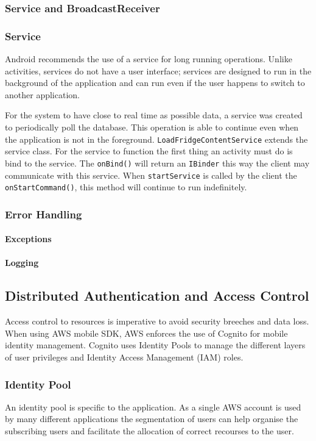 \documentclass[a4paper, 11pt]{article}
\begin{document}
\subsubsection{Service and BroadcastReceiver}
\subsubsection{Service}	
Android recommends the use of a service for long running operations. Unlike activities, services do not have a user interface; services are designed to run in the background of the application and can run even if the user happens to switch to another application. 

For the system to have close to real time as possible data, a service was created to periodically poll the database. This operation is able to continue even when the application is not in the foreground. \texttt{LoadFridgeContentService} extends the service class. For the service to function the first thing an activity must do is bind to the service. The \texttt{onBind()} will return an \texttt{IBinder} this way the client may communicate with this service. When \texttt{startService} is called by the client the \texttt{onStartCommand()}, this method will continue to run indefinitely.


\subsubsection{Error Handling}
\paragraph{Exceptions}
\paragraph{Logging}


\subsection{Distributed Authentication and Access Control}
Access control to resources is imperative to avoid security breeches and data loss. When using AWS mobile SDK, AWS enforces the use of Cognito for mobile identity management. Cognito uses Identity Pools to manage the different layers of user privileges and Identity Access Management (IAM) roles.

\subsubsection{Identity Pool}
An identity pool is specific to the application. As a single AWS account is used by many different applications the segmentation of users can help organise the subscribing users and facilitate the allocation of correct recourses to the user. 
\end{document}
